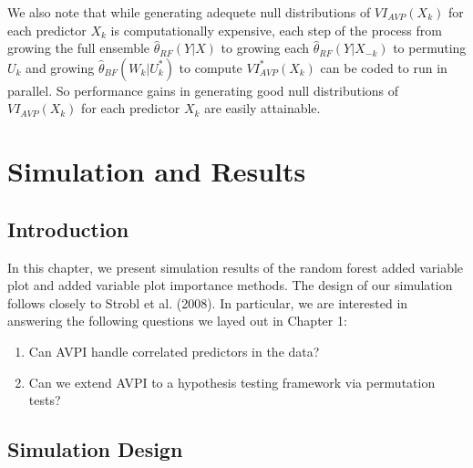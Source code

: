 \documentclass[12pt,twoside]{reedthesis}
\theoremstyle{definition}
\theoremstyle{definition}
\theoremstyle{definition}
\theoremstyle{remark}
\begin{document}
We also note that while generating adequete null distributions of
\(VI_{AVP}(X_k)\) for each predictor \(X_k\) is computationally
expensive, each step of the process from growing the full ensemble
\(\hat{\theta}_{RF}(Y|X)\) to growing each
\(\hat{\theta}_{RF}(Y|X_{-k})\) to permuting \(U_k\) and growing
\(\hat{\theta}_{BF}(W_k|U_k^*)\) to compute \(VI_{AVP}^*(X_k)\) can be
coded to run in parallel. So performance gains in generating good null
distributions of \(VI_{AVP}(X_k)\) for each predictor \(X_k\) are easily
attainable. \par

\chapter{Simulation and Results}\label{simulation-and-results}

\section{Introduction}\label{introduction-3}

In this chapter, we present simulation results of the random forest
added variable plot and added variable plot importance methods. The
design of our simulation follows closely to Strobl et al. (2008). In
particular, we are interested in answering the following questions we
layed out in Chapter 1:
\begin{enumerate}
  \item Can AVPI handle correlated predictors in the data? 
  \item Can we extend AVPI to a hypothesis testing framework via permutation tests?
  \end{enumerate}
\par

\section{Simulation Design}\label{simulation-design}
\end{document}
